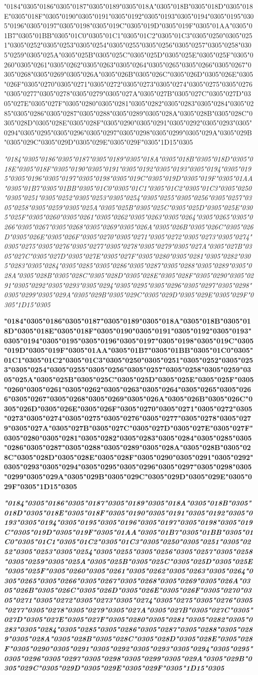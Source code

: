 \documentclass[landscape]{article}
\newcommand{\gs}{\hspace{0.5mm}}	%
\newcommand{\ribbi}[1]{#1\
	
	{\itshape #1}
	
	{\bfseries #1}
	
	{\itshape\bfseries #1}}
\begin{document}
\ribbi{
	\char"0184\char"0305\gs \char"0186\char"0305\gs \char"0187\char"0305\gs \char"0189\char"0305\gs \char"018A\char"0305\gs \char"018B\char"0305\gs \char"018D\char"0305\gs \char"018E\char"0305\gs \char"018F\char"0305\gs \char"0190\char"0305\gs \char"0191\char"0305\gs \char"0192\char"0305\gs \char"0193\char"0305\gs \char"0194\char"0305\gs \char"0195\char"0305\gs \char"0196\char"0305\gs \char"0197\char"0305\gs \char"0198\char"0305\gs \char"019C\char"0305\gs \char"019D\char"0305\gs \char"019F\char"0305\gs \char"01AA\char"0305\gs \char"01B7\char"0305\gs \char"01BB\char"0305\gs \char"01C0\char"0305\gs \char"01C1\char"0305\gs \char"01C2\char"0305\gs \char"01C3\char"0305\gs \char"0250\char"0305\gs \char"0251\char"0305\gs \char"0252\char"0305\gs \char"0253\char"0305\gs \char"0254\char"0305\gs \char"0255\char"0305\gs \char"0256\char"0305\gs \char"0257\char"0305\gs \char"0258\char"0305\gs \char"0259\char"0305\gs \char"025A\char"0305\gs \char"025B\char"0305\gs \char"025C\char"0305\gs \char"025D\char"0305\gs \char"025E\char"0305\gs \char"025F\char"0305\gs \char"0260\char"0305\gs \char"0261\char"0305\gs \char"0262\char"0305\gs \char"0263\char"0305\gs \char"0264\char"0305\gs \char"0265\char"0305\gs \char"0266\char"0305\gs \char"0267\char"0305\gs \char"0268\char"0305\gs \char"0269\char"0305\gs \char"026A\char"0305\gs \char"026B\char"0305\gs \char"026C\char"0305\gs \char"026D\char"0305\gs \char"026E\char"0305\gs \char"026F\char"0305\gs \char"0270\char"0305\gs \char"0271\char"0305\gs \char"0272\char"0305\gs \char"0273\char"0305\gs \char"0274\char"0305\gs \char"0275\char"0305\gs \char"0276\char"0305\gs \char"0277\char"0305\gs \char"0278\char"0305\gs \char"0279\char"0305\gs \char"027A\char"0305\gs \char"027B\char"0305\gs \char"027C\char"0305\gs \char"027D\char"0305\gs \char"027E\char"0305\gs \char"027F\char"0305\gs \char"0280\char"0305\gs \char"0281\char"0305\gs \char"0282\char"0305\gs \char"0283\char"0305\gs \char"0284\char"0305\gs \char"0285\char"0305\gs \char"0286\char"0305\gs \char"0287\char"0305\gs \char"0288\char"0305\gs \char"0289\char"0305\gs \char"028A\char"0305\gs \char"028B\char"0305\gs \char"028C\char"0305\gs \char"028D\char"0305\gs \char"028E\char"0305\gs \char"028F\char"0305\gs \char"0290\char"0305\gs \char"0291\char"0305\gs \char"0292\char"0305\gs \char"0293\char"0305\gs \char"0294\char"0305\gs \char"0295\char"0305\gs \char"0296\char"0305\gs \char"0297\char"0305\gs \char"0298\char"0305\gs \char"0299\char"0305\gs \char"029A\char"0305\gs \char"029B\char"0305\gs \char"029C\char"0305\gs \char"029D\char"0305\gs \char"029E\char"0305\gs \char"029F\char"0305\gs \char"1D15\char"0305\gs
}
\end{document}
